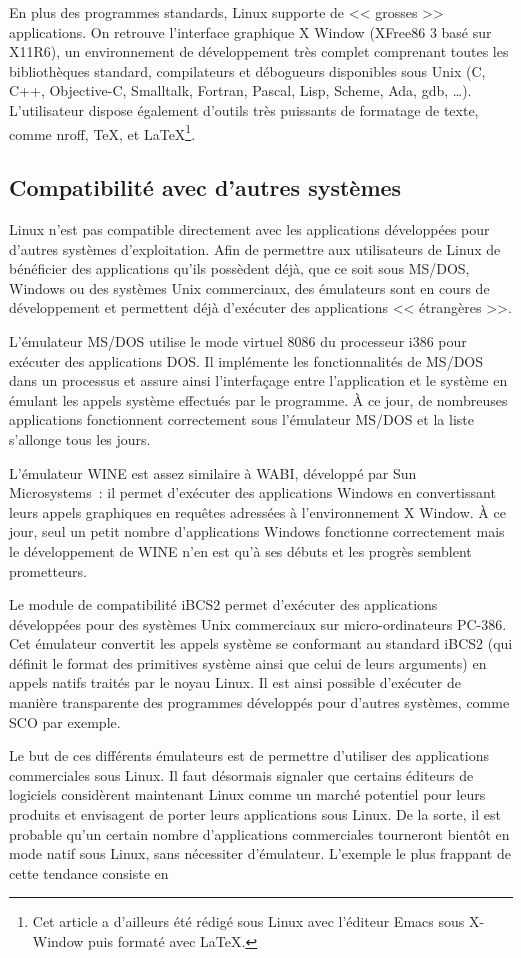 \documentclass[11pt,a4paper]{article}
\begin{document}
	En plus des programmes standards, Linux supporte de << grosses >>
applications. On retrouve l'interface graphique X Window (XFree86 3 basé
sur X11R6), un environnement de développement très complet comprenant toutes
les bibliothèques standard, compilateurs et débogueurs disponibles sous Unix
(C, C++, Objective-C, Smalltalk, Fortran, Pascal, Lisp, Scheme, Ada, gdb,
\ldots). L'utilisateur dispose également d'outils très puissants de formatage
de texte, comme nroff, \TeX, et \LaTeX\footnote{Cet article a d'ailleurs
été rédigé sous Linux avec l'éditeur Emacs sous X-Window puis formaté avec
\LaTeX.}.

\subsection{Compatibilité avec d'autres systèmes}

	Linux n'est pas compatible directement avec les applications
développées pour d'autres systèmes d'exploitation. Afin de permettre aux
utilisateurs de Linux de bénéficier des applications qu'ils possèdent déjà,
que ce soit sous MS/DOS, Windows ou des systèmes Unix commerciaux, des
émulateurs sont en cours de développement et permettent déjà d'exécuter des
applications << étrangères >>.

	L'émulateur MS/DOS utilise le mode virtuel 8086 du processeur i386
pour exécuter des applications DOS. Il implémente les fonctionnalités de
MS/DOS dans un processus et assure ainsi l'interfaçage entre l'application et
le système en émulant les appels système effectués par le programme. À ce
jour, de nombreuses applications fonctionnent correctement sous l'émulateur
MS/DOS et la liste s'allonge tous les jours.

	L'émulateur WINE est assez similaire à WABI, développé par Sun
Microsystems~: il permet d'exécuter des applications Windows en convertissant
leurs appels graphiques en requêtes adressées à l'environnement X Window. À
ce jour, seul un petit nombre d'applications Windows fonctionne correctement
mais le développement de WINE n'en est qu'à ses débuts et les progrès semblent
prometteurs.

	Le module de compatibilité iBCS2 permet d'exécuter des
applications développées pour des systèmes Unix commerciaux sur
micro-ordinateurs PC-386. Cet émulateur convertit les appels système se
conformant au standard iBCS2 (qui définit le format des primitives système
ainsi que celui de leurs arguments) en appels natifs traités par le noyau
Linux. Il est ainsi possible d'exécuter de manière transparente des programmes
développés pour d'autres systèmes, comme SCO par exemple.

	Le but de ces différents émulateurs est de permettre d'utiliser des
applications commerciales sous Linux. Il faut désormais signaler que certains
éditeurs de logiciels considèrent maintenant Linux comme un marché potentiel
pour leurs produits et envisagent de porter leurs applications sous Linux. De
la sorte, il est probable qu'un certain nombre d'applications commerciales
tourneront bientôt en mode natif sous Linux, sans nécessiter
d'émulateur. L'exemple le plus frappant de cette tendance consiste en
\end{document}
